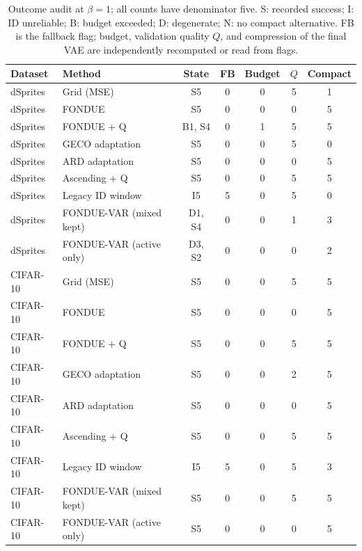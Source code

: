 \documentclass[make,article,submit,pdftex,moreauthors]{Definitions/mdpi}
\begin{document}
\begin{table}[H]
\caption{Outcome audit at $\beta=1$; all counts have denominator five. S: recorded success; I: ID unreliable; B: budget exceeded; D: degenerate; N: no compact alternative. FB is the fallback flag; budget, validation quality $Q$, and compression of the final VAE are independently recomputed or read from flags.}\label{tab:outcomes1}
\footnotesize
\setlength{\tabcolsep}{3.5pt}
\begin{tabular*}{\textwidth}{@{\extracolsep{\fill}}llccccc@{}}
\toprule
Dataset & Method & State & FB & Budget & $Q$ & Compact \\
\midrule
dSprites & Grid (MSE) & S5 & 0 & 0 & 5 & 1 \\
dSprites & FONDUE & S5 & 0 & 0 & 0 & 5 \\
dSprites & FONDUE + Q & B1, S4 & 0 & 1 & 5 & 5 \\
dSprites & GECO adaptation & S5 & 0 & 0 & 5 & 0 \\
dSprites & ARD adaptation & S5 & 0 & 0 & 0 & 5 \\
dSprites & Ascending + Q & S5 & 0 & 0 & 5 & 5 \\
dSprites & Legacy ID window & I5 & 5 & 0 & 5 & 0 \\
dSprites & FONDUE-VAR (mixed kept) & D1, S4 & 0 & 0 & 1 & 3 \\
dSprites & FONDUE-VAR (active only) & D3, S2 & 0 & 0 & 0 & 2 \\
CIFAR-10 & Grid (MSE) & S5 & 0 & 0 & 5 & 5 \\
CIFAR-10 & FONDUE & S5 & 0 & 0 & 0 & 5 \\
CIFAR-10 & FONDUE + Q & S5 & 0 & 0 & 5 & 5 \\
CIFAR-10 & GECO adaptation & S5 & 0 & 0 & 2 & 5 \\
CIFAR-10 & ARD adaptation & S5 & 0 & 0 & 0 & 5 \\
CIFAR-10 & Ascending + Q & S5 & 0 & 0 & 5 & 5 \\
CIFAR-10 & Legacy ID window & I5 & 5 & 0 & 5 & 3 \\
CIFAR-10 & FONDUE-VAR (mixed kept) & S5 & 0 & 0 & 5 & 5 \\
CIFAR-10 & FONDUE-VAR (active only) & S5 & 0 & 0 & 0 & 5 \\
\bottomrule
\end{tabular*}
\end{table}
\end{document}
